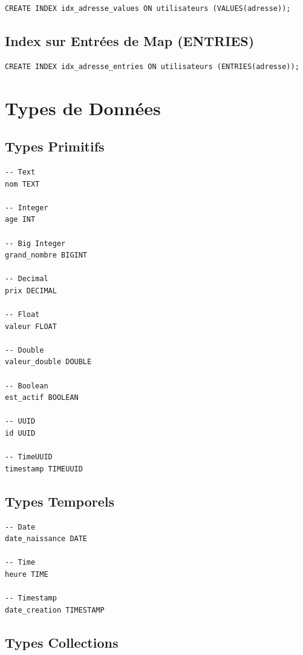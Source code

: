 \documentclass[11pt,a4paper]{article}
\begin{document}
\begin{lstlisting}
CREATE INDEX idx_adresse_values ON utilisateurs (VALUES(adresse));
\end{lstlisting}

\subsection{Index sur Entrées de Map (ENTRIES)}

\begin{lstlisting}
CREATE INDEX idx_adresse_entries ON utilisateurs (ENTRIES(adresse));
\end{lstlisting}

\newpage

\section{Types de Données}

\subsection{Types Primitifs}

\begin{lstlisting}
-- Text
nom TEXT

-- Integer
age INT

-- Big Integer
grand_nombre BIGINT

-- Decimal
prix DECIMAL

-- Float
valeur FLOAT

-- Double
valeur_double DOUBLE

-- Boolean
est_actif BOOLEAN

-- UUID
id UUID

-- TimeUUID
timestamp TIMEUUID
\end{lstlisting}

\subsection{Types Temporels}

\begin{lstlisting}
-- Date
date_naissance DATE

-- Time
heure TIME

-- Timestamp
date_creation TIMESTAMP
\end{lstlisting}

\subsection{Types Collections}
\end{document}
